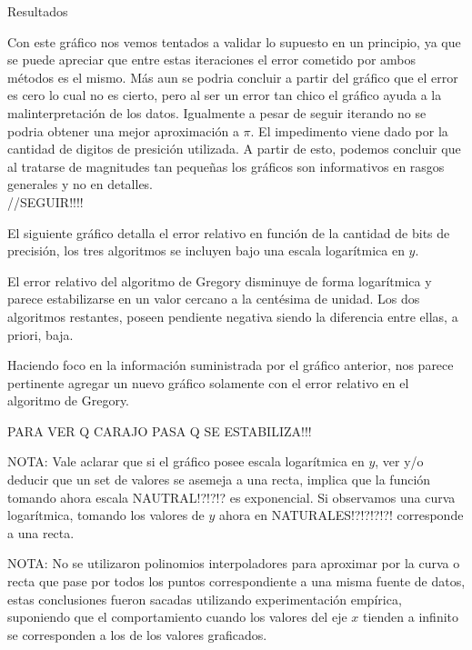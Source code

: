 \begin{section}{Resultados}
	
	Con este gráfico nos vemos tentados a validar lo supuesto en un principio, ya que se puede apreciar que entre estas iteraciones el error cometido por ambos métodos es el mismo. Más aun se podria concluir a partir del gráfico que el error es cero lo cual no es cierto, pero al ser un error tan chico el gráfico ayuda a la malinterpretación de los datos. Igualmente a pesar de seguir iterando no se podria obtener una mejor aproximación a $\pi$. El impedimento viene dado por la cantidad de digitos de presición utilizada.
	A partir de esto, podemos concluir que al tratarse de magnitudes tan pequeñas los gráficos son informativos en rasgos generales y no en detalles.\\	
	
	//SEGUIR!!!!
	
	\VSP
	El siguiente gráfico detalla el error relativo en función de la cantidad de bits de precisión, los tres algoritmos se incluyen bajo una escala logarítmica en $y$. 


	El error relativo del algoritmo de Gregory disminuye de forma logarítmica y parece estabilizarse en un valor cercano a la centésima de unidad. Los dos algoritmos restantes, poseen pendiente negativa siendo la diferencia entre ellas, a priori, baja.
	
	Haciendo foco en la información suministrada por el gráfico anterior, nos parece pertinente agregar un nuevo gráfico solamente con el error relativo en el algoritmo de Gregory.
	
	PARA VER Q CARAJO PASA Q SE ESTABILIZA!!!

	NOTA: Vale aclarar que si el gráfico posee escala logarítmica en $y$, ver y/o deducir que un set de valores se asemeja a una recta, implica que la función tomando ahora escala NAUTRAL!?!?!? es exponencial. Si observamos una curva logarítmica, tomando los valores de $y$ ahora en NATURALES!?!?!?!?! corresponde a una recta.
	
	NOTA: No se utilizaron polinomios interpoladores para aproximar por la curva o recta que pase por todos los puntos correspondiente a una misma fuente de datos, estas conclusiones fueron sacadas utilizando experimentación empírica, suponiendo que el comportamiento cuando los valores del eje $x$ tienden a infinito se corresponden a los de los valores graficados.

\end{section}
